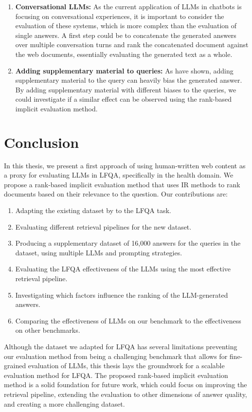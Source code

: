 \begin{enumerate}
    \item \textbf{Conversational LLMs:} As the current application of LLMs in chatbots is focusing on conversational experiences, it is important to consider the evaluation of these systems, which is more complex than the evaluation of single answers. A first step could be to concatenate the generated answers over multiple conversation turns and rank the concatenated document against the web documents, essentially evaluating the generated text as a whole.
    \item \textbf{Adding supplementary material to queries:} As \cite{koopman:2023:dr} have shown, adding supplementary material to the query can heavily bias the generated answer. By adding supplementary material with different biases to the queries, we could investigate if a similar effect can be observed using the rank-based implicit evaluation method.
\end{enumerate}

\section{Conclusion}
In this thesis, we present a first approach of using human-written web content as a proxy for evaluating LLMs in LFQA, specifically in the health domain.
We propose a rank-based implicit evaluation method that uses IR methods to rank documents based on their relevance to the question.
Our contributions are:
\begin{enumerate}
    \item Adapting the existing dataset by \cite{goeuriot:2021:Consumer} to the LFQA task.
    \item Evaluating different retrieval pipelines for the new dataset.
    \item Producing a supplementary dataset of 16,000 answers for the queries in the dataset, using multiple LLMs and prompting strategies.
    \item Evaluating the LFQA effectiveness of the LLMs using the most effective retrieval pipeline.
    \item Investigating which factors influence the ranking of the LLM-generated answers.
    \item Comparing the effectiveness of LLMs on our benchmark to the effectiveness on other benchmarks.
\end{enumerate}

Although the dataset we adapted for LFQA has several limitations preventing our evaluation method from being a challenging benchmark that allows for fine-grained evaluation of LLMs, this thesis lays the groundwork for a scalable evaluation method for LFQA.
The proposed rank-based implicit evaluation method is a solid foundation for future work, which could focus on improving the retrieval pipeline, extending the evaluation to other dimensions of answer quality, and creating a more challenging dataset.